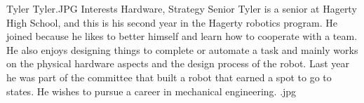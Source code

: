 \insertbio
{Tyler}
{Tyler.JPG}
{Interests}
{Hardware, Strategy}
{Senior}
{  
Tyler is a senior at Hagerty High School, and this is his second year in the Hagerty robotics program. He joined because he likes to better himself and learn how to cooperate with a team. He also enjoys designing things to complete or automate a task and mainly works on the physical hardware aspects and the design process of the robot. Last year he was part of the committee that built a robot that earned a spot to go to states. He wishes to pursue a career in mechanical engineering. 
}
{.jpg}
